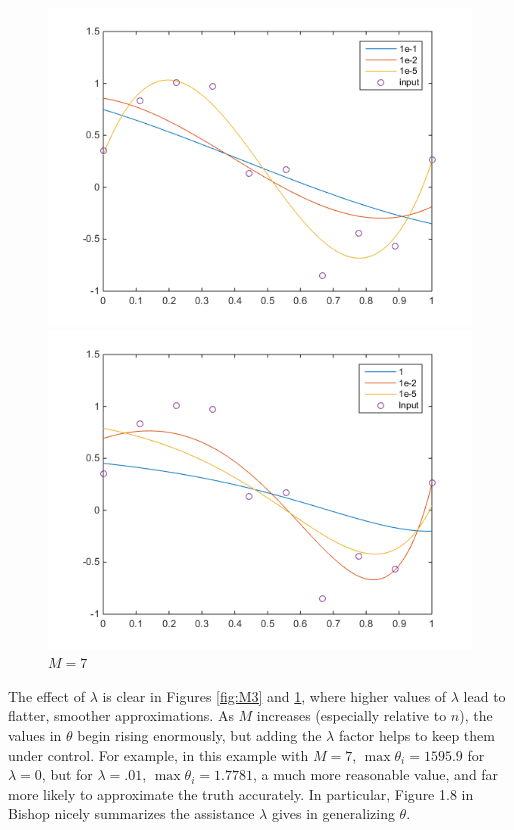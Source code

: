 \documentclass[11pt,letterpaper]{article}
\begin{document}
\begin{figure}[!htb]
  \includegraphics[width=\linewidth]{figures/M3.png}
  \caption{$M=3$}\label{fig:M3}
\endminipage\hfill
{}
  \includegraphics[width=\linewidth]{figures/M7.png}
  \caption{$M=7$}\label{fig:M7}
\endminipage
\end{figure}
The effect of $\lambda$ is clear in Figures \ref{fig:M3} and \ref{fig:M7}, where higher values of $\lambda$ lead to flatter, smoother approximations. As $M$ increases (especially relative to $n$), the values in $\theta$ begin rising enormously, but adding the $\lambda$ factor helps to keep them under control. For example, in this example with $M=7$, $\max \theta_i = 1595.9$ for $\lambda = 0$, but for $\lambda = .01$, $\max \theta_i = 1.7781$, a much more reasonable value, and far more likely to approximate the truth accurately. In particular, Figure 1.8 in Bishop nicely summarizes the assistance $\lambda$ gives in generalizing $\theta$.
\end{document}
